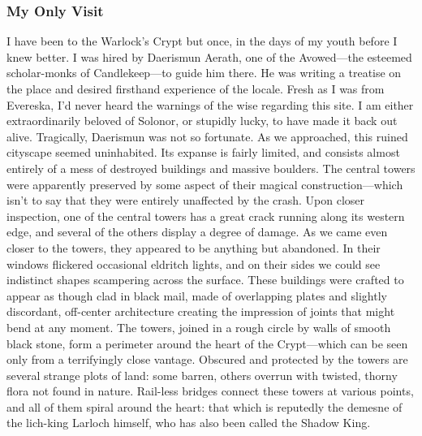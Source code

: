 \documentclass[10pt,a4paper,twoside,twocolumn,openany,bg=print,nodeprecatedcode]{dndbook}
\begin{document}
\subsubsection{My Only Visit}
I have been to the Warlock's Crypt but once, in the days of my youth before I knew better. I was hired by Daerismun Aerath, one of the Avowed—the esteemed scholar-monks of Candlekeep—to guide him there. He was writing a treatise on the place and desired firsthand experience of the locale. Fresh as I was from Evereska, I'd never heard the warnings of the wise regarding this site. I am either extraordinarily beloved of Solonor, or stupidly lucky, to have made it back out alive. Tragically, Daerismun was not so fortunate.
As we approached, this ruined cityscape seemed uninhabited. Its expanse is fairly limited, and consists almost entirely of a mess of destroyed buildings and massive boulders.
The central towers were apparently preserved by some aspect of their magical construction—which isn't to say that they were entirely unaffected by the crash. Upon closer inspection, one of the central towers has a great crack running along its western edge, and several of the others display a degree of damage.
As we came even closer to the towers, they appeared to be anything but abandoned. In their windows flickered occasional eldritch lights, and on their sides we could see indistinct shapes scampering across the surface. These buildings were crafted to appear as though clad in black mail, made of overlapping plates and slightly discordant, off-center architecture creating the impression of joints that might bend at any moment.
The towers, joined in a rough circle by walls of smooth black stone, form a perimeter around the heart of the Crypt—which can be seen only from a terrifyingly close vantage. Obscured and protected by the towers are several strange plots of land: some barren, others overrun with twisted, thorny flora not found in nature. Rail-less bridges connect these towers at various points, and all of them spiral around the heart: that which is reputedly the demesne of the lich-king Larloch himself, who has also been called the Shadow King.
\end{document}
